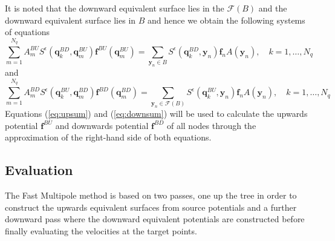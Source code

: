 It is noted that the downward equivalent surface lies in the $\mathcal{F}(B)$ and the downward equivalent surface lies in $B$ and hence we obtain the following systems of equations
\begin{equation}
\label{eq:upsum}
    \sum_{m=1}^{N_{q}} A_{m}^{BU} S^\epsilon\left(\bm{q}^{BD}_{k}, \bm{q}_{m}^{B U}\right) \bm{f}^{B U}\left(\bm{q}_{m}^{B U}\right)=\sum_{{\bm{y}}_{n} \in B} S^\epsilon\left(\bm{q}^{BD}_{k}, {\bm{y}}_{n}\right) {\bm{f}}_{n} A({\bm{y}}_n), \quad k=1,\dots,N_q
\end{equation}
and
\begin{equation}
\label{eq:downsum}
    \sum_{m=1}^{N_{q}} A_{m}^{BD} S^\epsilon\left(\bm{q}^{BU}_{k}, \bm{q}_{m}^{B D}\right) \bm{f}^{B D}\left(\bm{q}_{m}^{B D}\right)=\sum_{{\bm{y}}_{n} \in \mathcal{F}(B)} S^\epsilon\left(\bm{q}^{BU}_{k}, {\bm{y}}_{n}\right) {\bm{f}}_{n} A({\bm{y}}_n), \quad k=1,\dots,N_q
\end{equation}
Equations (\ref{eq:upsum}) and (\ref{eq:downsum}) will be used to calculate the upwards potential $\bm{f}^{B U}$ and downwards potential $\bm{f}^{B D}$ of all nodes through the approximation of the right-hand side of both equations.

\subsection{Evaluation}
The Fast Multipole method is based on two passes, one up the tree in order to construct the upwards equivalent surfaces from source potentials and a further downward pass where the downward equivalent potentials are constructed before finally evaluating the velocities at the target points.

